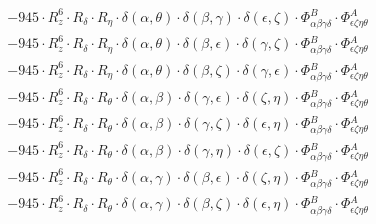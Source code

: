 \documentclass{article}
\begin{document}
\begin{equation}
\begin{array}{c}
 \\[0.2em] 		 - 945 \cdot R_{z}^{6} \cdot R_{\delta{}} \cdot R_{\eta{}} \cdot \delta{}\left(\alpha{}, \theta{}\right) \cdot \delta{}\left(\beta{}, \gamma{}\right) \cdot \delta{}\left(\epsilon{}, \zeta{}\right) \cdot \Phi{}^{B}_{\alpha{}\beta{}\gamma{}\delta{}} \cdot \Phi{}^{A}_{\epsilon{}\zeta{}\eta{}\theta{}} 
 \\[0.2em] 		 - 945 \cdot R_{z}^{6} \cdot R_{\delta{}} \cdot R_{\eta{}} \cdot \delta{}\left(\alpha{}, \theta{}\right) \cdot \delta{}\left(\beta{}, \epsilon{}\right) \cdot \delta{}\left(\gamma{}, \zeta{}\right) \cdot \Phi{}^{B}_{\alpha{}\beta{}\gamma{}\delta{}} \cdot \Phi{}^{A}_{\epsilon{}\zeta{}\eta{}\theta{}} 
 \\[0.2em] 		 - 945 \cdot R_{z}^{6} \cdot R_{\delta{}} \cdot R_{\eta{}} \cdot \delta{}\left(\alpha{}, \theta{}\right) \cdot \delta{}\left(\beta{}, \zeta{}\right) \cdot \delta{}\left(\gamma{}, \epsilon{}\right) \cdot \Phi{}^{B}_{\alpha{}\beta{}\gamma{}\delta{}} \cdot \Phi{}^{A}_{\epsilon{}\zeta{}\eta{}\theta{}} 
 \\[0.2em] 		 - 945 \cdot R_{z}^{6} \cdot R_{\delta{}} \cdot R_{\theta{}} \cdot \delta{}\left(\alpha{}, \beta{}\right) \cdot \delta{}\left(\gamma{}, \epsilon{}\right) \cdot \delta{}\left(\zeta{}, \eta{}\right) \cdot \Phi{}^{B}_{\alpha{}\beta{}\gamma{}\delta{}} \cdot \Phi{}^{A}_{\epsilon{}\zeta{}\eta{}\theta{}} 
 \\[0.2em] 		 - 945 \cdot R_{z}^{6} \cdot R_{\delta{}} \cdot R_{\theta{}} \cdot \delta{}\left(\alpha{}, \beta{}\right) \cdot \delta{}\left(\gamma{}, \zeta{}\right) \cdot \delta{}\left(\epsilon{}, \eta{}\right) \cdot \Phi{}^{B}_{\alpha{}\beta{}\gamma{}\delta{}} \cdot \Phi{}^{A}_{\epsilon{}\zeta{}\eta{}\theta{}} 
 \\[0.2em] 		 - 945 \cdot R_{z}^{6} \cdot R_{\delta{}} \cdot R_{\theta{}} \cdot \delta{}\left(\alpha{}, \beta{}\right) \cdot \delta{}\left(\gamma{}, \eta{}\right) \cdot \delta{}\left(\epsilon{}, \zeta{}\right) \cdot \Phi{}^{B}_{\alpha{}\beta{}\gamma{}\delta{}} \cdot \Phi{}^{A}_{\epsilon{}\zeta{}\eta{}\theta{}} 
 \\[0.2em] 		 - 945 \cdot R_{z}^{6} \cdot R_{\delta{}} \cdot R_{\theta{}} \cdot \delta{}\left(\alpha{}, \gamma{}\right) \cdot \delta{}\left(\beta{}, \epsilon{}\right) \cdot \delta{}\left(\zeta{}, \eta{}\right) \cdot \Phi{}^{B}_{\alpha{}\beta{}\gamma{}\delta{}} \cdot \Phi{}^{A}_{\epsilon{}\zeta{}\eta{}\theta{}} 
 \\[0.2em] 		 - 945 \cdot R_{z}^{6} \cdot R_{\delta{}} \cdot R_{\theta{}} \cdot \delta{}\left(\alpha{}, \gamma{}\right) \cdot \delta{}\left(\beta{}, \zeta{}\right) \cdot \delta{}\left(\epsilon{}, \eta{}\right) \cdot \Phi{}^{B}_{\alpha{}\beta{}\gamma{}\delta{}} \cdot \Phi{}^{A}_{\epsilon{}\zeta{}\eta{}\theta{}} 

\end{array}
\end{equation}
\end{document}
